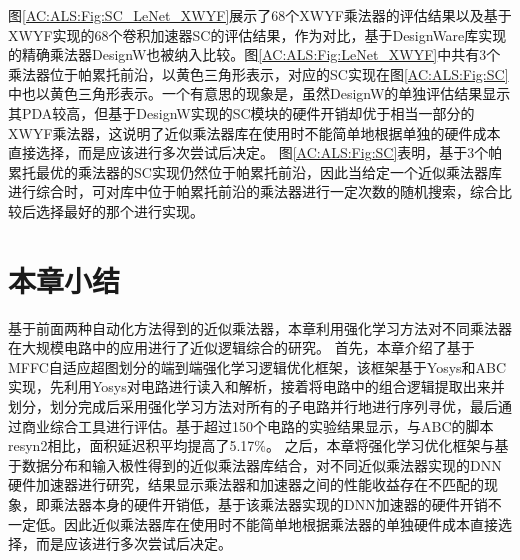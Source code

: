 图\ref{AC:ALS:Fig:SC_LeNet_XWYF}展示了68个XWYF乘法器的评估结果以及基于XWYF实现的68个卷积加速器SC\cite{Accelerator:SC}的评估结果，作为对比，基于DesignWare库\cite{IP:DesignWare}实现的精确乘法器DesignW也被纳入比较。图\ref{AC:ALS:Fig:LeNet_XWYF}中共有3个乘法器位于帕累托前沿，以黄色三角形表示，对应的SC实现在图\ref{AC:ALS:Fig:SC}中也以黄色三角形表示。一个有意思的现象是，虽然DesignW的单独评估结果显示其PDA较高，但基于DesignW实现的SC模块的硬件开销却优于相当一部分的XWYF乘法器，这说明了近似乘法器库在使用时不能简单地根据单独的硬件成本直接选择，而是应该进行多次尝试后决定。
图\ref{AC:ALS:Fig:SC}表明，基于3个帕累托最优的乘法器的SC实现仍然位于帕累托前沿，因此当给定一个近似乘法器库进行综合时，可对库中位于帕累托前沿的乘法器进行一定次数的随机搜索，综合比较后选择最好的那个进行实现。

\section{本章小结}

基于前面两种自动化方法得到的近似乘法器，本章利用强化学习方法对不同乘法器在大规模电路中的应用进行了近似逻辑综合的研究。
首先，本章介绍了基于MFFC自适应超图划分的端到端强化学习逻辑优化框架，该框架基于Yosys和ABC实现，先利用Yosys对电路进行读入和解析，接着将电路中的组合逻辑提取出来并划分，划分完成后采用强化学习方法对所有的子电路并行地进行序列寻优，最后通过商业综合工具进行评估。基于超过150个电路的实验结果显示，与ABC的脚本resyn2相比，面积延迟积平均提高了5.17\%。
之后，本章将强化学习优化框架与基于数据分布和输入极性得到的近似乘法器库结合，对不同近似乘法器实现的DNN硬件加速器进行研究，结果显示乘法器和加速器之间的性能收益存在不匹配的现象，即乘法器本身的硬件开销低，基于该乘法器实现的DNN加速器的硬件开销不一定低。因此近似乘法器库在使用时不能简单地根据乘法器的单独硬件成本直接选择，而是应该进行多次尝试后决定。